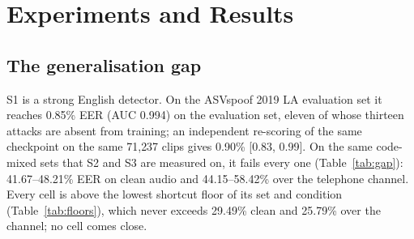 
\section{Experiments and Results}
\label{sec:results}

\subsection{The generalisation gap}
\label{sec:gap}

S1 is a strong English detector. On the ASVspoof 2019 LA evaluation set it reaches
0.85\% EER (AUC 0.994) on the evaluation set, eleven of whose thirteen attacks are absent
from training; an independent
re-scoring of the same checkpoint on the same 71{,}237 clips gives 0.90\%
[0.83, 0.99]. On the same
code-mixed sets that S2 and S3 are measured on, it fails every one
(Table~\ref{tab:gap}): 41.67--48.21\% EER on clean audio and 44.15--58.42\% over the
telephone channel. Every cell is above the lowest shortcut floor of its set and
condition (Table~\ref{tab:floors}), which never exceeds 29.49\% clean and 25.79\%
over the channel; no cell comes close.

\begin{table}[t]
\centering
\caption{S1, trained on English only, on the normalised code-mixed sets. Floor: the
lowest shortcut floor of that set and condition in Table~\ref{tab:floors}.}
\label{tab:gap}
\small
{}
\end{table}


